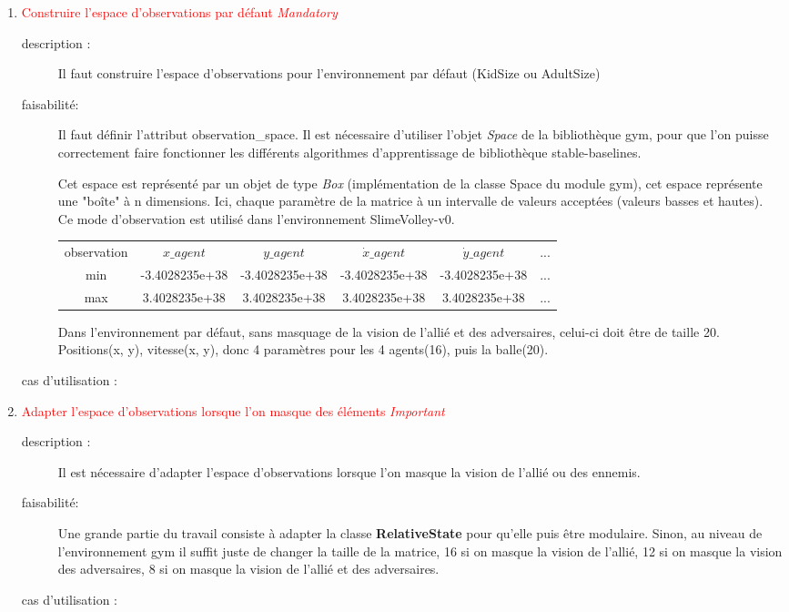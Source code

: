 \documentclass[11pt, a4paper]{article}
\newcommand{\besoinVItem}[4]{
	\item #1
	\begin{description}
		\item[description :]
		#2
		\item[faisabilité: ]
		#3
		\item[cas d'utilisation :]
		#4
	\end{description}
}
\begin{document}
\begin{enumerate}
		\begin{enumerate}
			\besoinVItem{\textcolor{red}{Construire l'espace d'observations par défaut \textit{Mandatory}}
			}
			{Il faut construire l'espace d'observations pour l'environnement par défaut (KidSize ou AdultSize)
			}
			{Il faut définir l'attribut observation\_space. Il est nécessaire d'utiliser l'objet \textit{Space} de la bibliothèque gym, pour que l'on puisse correctement faire fonctionner
			les différents algorithmes d'apprentissage de bibliothèque stable-baselines.

			Cet espace est représenté par un objet de type \textit{Box} (implémentation de la classe Space du module gym), cet espace représente une "boîte" à n dimensions.
			Ici, chaque paramètre de la matrice à un intervalle de valeurs acceptées (valeurs basses et hautes).\\

			Ce mode d'observation est utilisé dans l'environnement SlimeVolley-v0.

				\begin{center}
					\begin{tabular}{ |c|c|c|c|c|c| }

						\hline
						observation    & $x\_agent$ & $y\_agent$ & $\dot{x} \_agent$ & $\dot{y} \_agent$ & ...\\
						min & -3.4028235e+38 & -3.4028235e+38 & -3.4028235e+38 & -3.4028235e+38 & ...\\
						max & 3.4028235e+38 & 3.4028235e+38 & 3.4028235e+38 & 3.4028235e+38 & ...  \\
						\hline
					\end{tabular}
				\end{center}

				Dans l'environnement par défaut, sans masquage de la vision de l'allié et des adversaires, celui-ci doit être de taille 20. Positions(x, y), vitesse(x, y), donc 4 paramètres pour les 4 agents(16), puis la balle(20).
			}
			{}

			\besoinVItem{\textcolor{red}{Adapter l'espace d'observations lorsque l'on masque des éléments \textit{Important}}
			}
			{Il est nécessaire d'adapter l'espace d'observations lorsque l'on masque la vision de l'allié ou des ennemis.
			}
			{Une grande partie du travail consiste à adapter la classe \textbf{RelativeState} pour qu'elle puis être modulaire. Sinon, au niveau de l'environnement gym il suffit juste de changer la taille de la matrice, 16 si on masque la vision de l'allié, 12 si on masque la vision des adversaires, 8 si on masque la vision de l'allié et des adversaires.
			}
			{}


\end{enumerate}
\end{enumerate}
\end{document}
